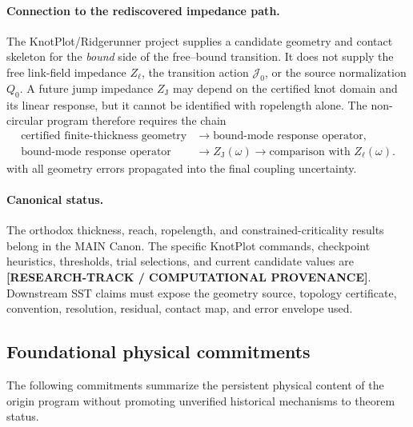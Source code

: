 \documentclass[11pt]{article}
\theoremstyle{definition}
\theoremstyle{plain}
\theoremstyle{remark}
\begin{document}
\paragraph{Connection to the rediscovered impedance path.}
The KnotPlot/Ridgerunner project supplies a candidate geometry and contact
skeleton for the \emph{bound} side of the free--bound transition.  It does not
supply the free link-field impedance $Z_\ell$, the transition action
$\mathcal J_0$, or the source normalization $Q_0$.  A future jump impedance
$Z_{\mathrm J}$ may depend on the certified knot domain and its linear response,
but it cannot be identified with ropelength alone.  The non-circular program
therefore requires the chain
\begin{equation}
    \begin{aligned}
        \text{certified finite-thickness geometry}
        &\longrightarrow \text{bound-mode response operator},\\
        \text{bound-mode response operator}
        &\longrightarrow Z_{\mathrm J}(\omega)
        \longrightarrow \text{comparison with }Z_\ell(\omega).
    \end{aligned}
    \label{eq:genesis_bound_impedance_chain}
\end{equation}
with all geometry errors propagated into the final coupling uncertainty.

\paragraph{Canonical status.}
The orthodox thickness, reach, ropelength, and constrained-criticality results
belong in the MAIN Canon.  The specific KnotPlot commands, checkpoint
heuristics, thresholds, trial selections, and current candidate values are
\textbf{[RESEARCH-TRACK / COMPUTATIONAL PROVENANCE]}.  Downstream SST claims
must expose the geometry source, topology certificate, convention, resolution,
residual, contact map, and error envelope used.


\subsection{Foundational physical commitments}
\label{subsec:foundational_physical_commitments}

The following commitments summarize the persistent physical content of the
origin program without promoting unverified historical mechanisms to theorem
status.
\end{document}
